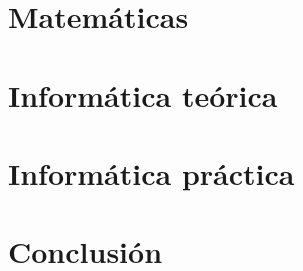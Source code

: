 \documentclass[openany]{book}
\begin{document}



\part{Matemáticas}









\part{Informática teórica}





 

\part{Informática práctica}





\part{Conclusión}


 



\renewcommand{\chaptername}{}
\printbibliography[heading=bibintoc]
\nocite{*}
\end{document}
